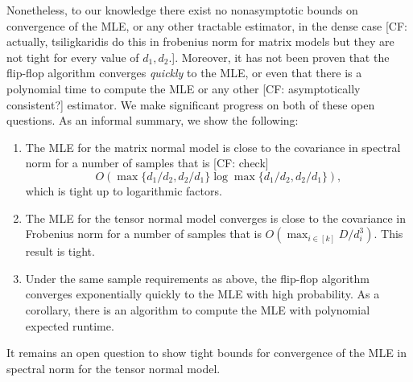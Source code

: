 \documentclass{article}
\newcommand{\CF}[1]{{\color{purple}[CF: #1]}}
\begin{document}
Nonetheless, to our knowledge there exist no nonasymptotic bounds on convergence of the MLE, or any other tractable estimator, in the dense case \CF{actually, tsiligkaridis do this in frobenius norm for matrix models but they are not tight for every value of $d_1, d_2$.}. Moreover, it has not been proven that the flip-flop algorithm converges \emph{quickly} to the MLE, or even that there is a polynomial time to compute the MLE or any other \CF{asymptotically consistent?} estimator. We make significant progress on both of these open questions. As an informal summary, we show the following:
\begin{enumerate}
\item The MLE for the matrix normal model is close to the covariance in spectral norm for a number of samples that is \CF{check}
$$O(\max \{d_1/d_2, d_2/d_1\} \log \max \{d_1/d_2, d_2/d_1\}),$$ which is tight up to logarithmic factors.
\item The MLE for the tensor normal model converges is close to the covariance in Frobenius norm for a number of samples that is $O(\max_{i \in [k]} D/d_i^3)$. This result is tight.
\item Under the same sample requirements as above, the flip-flop algorithm converges exponentially quickly to the MLE with high probability. As a corollary, there is an algorithm to compute the  MLE with polynomial expected runtime.
\end{enumerate}
It remains an open question to show tight bounds for convergence of the MLE in spectral norm for the tensor normal model. 
\end{document}
